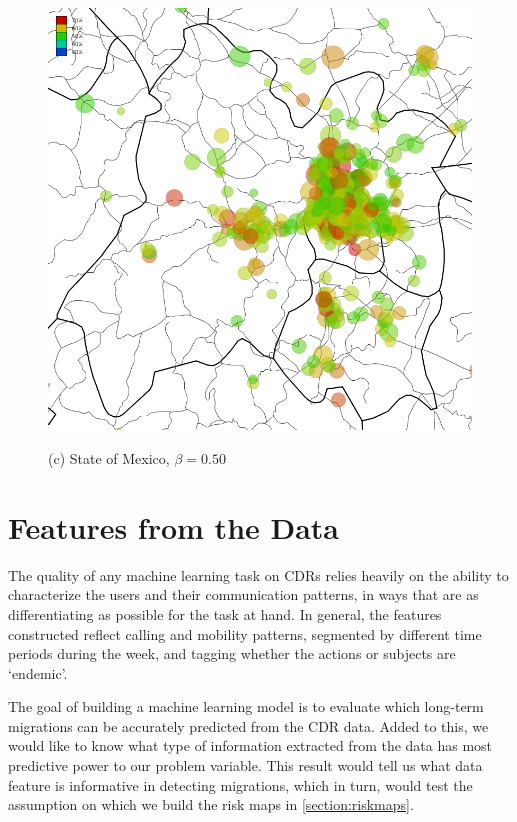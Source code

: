 \begin{figure}[p]
	\begin{minipage}{.6\linewidth}
		\centering
		\includegraphics[width=\columnwidth]
		{figures/estado_mexico_usuarios_volumen_circulos_allday_beta--50_min_volume--80_mexico_/estado_mexico_usuarios_volumen_circulos_allday_beta--50_min_volume--80_mexico_}

		(c) State of Mexico, $\beta = 0.50$
	\end{minipage}
\end{figure}



\section{Features from the Data}

The quality of any machine learning task on CDRs relies heavily on the ability to characterize the users and their communication patterns, in ways that are as differentiating as possible for the task at hand.
In general, the features constructed reflect calling and mobility patterns,
segmented by different time periods during the week, and tagging whether the actions or subjects are `endemic'.

The goal of building a machine learning model is to evaluate which long-term migrations can be accurately predicted from the CDR data.
Added to this, we would like to know what type of information extracted from the data has most predictive power to our problem variable.
This result would tell us what data feature is informative in detecting migrations, which in turn, would test the assumption on which we build the risk maps in \cref{section:riskmaps}.

